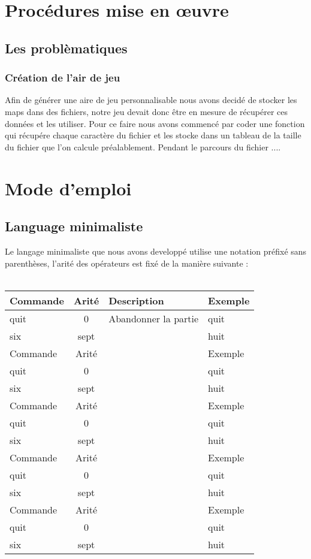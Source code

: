 \documentclass[a4paper, 11pt]{article}
\title{\myfont {Robots programmables}}
\author{\huge {COTREZ Léo}\and \huge {ORNIACKI Thomas}\and \\Université Paris-VIII, Saint-Denis, France\and \\Licence 2 Informatique}
\date{Premier Semestre 2018}
\begin{document}
\maketitle

\newpage
\tableofcontents

\newpage
\section{Procédures mise en \oe uvre}
\subsection{Les problèmatiques}
\subsubsection{Création de l'air de jeu}
Afin de générer une aire de jeu personnalisable nous avons decidé de stocker les maps dans des fichiers, notre jeu devait donc être en mesure de récupérer ces données et les utiliser. Pour ce faire nous avons commencé par coder une fonction qui récupére chaque caractère du fichier et les stocke dans un tableau de la taille du fichier que l'on calcule préalablement. Pendant le parcours du fichier ....

\newpage
\section{Mode d'emploi}
\subsection{Language minimaliste}
Le langage minimaliste que nous avons developpé utilise une notation préfixé sans parenthèses, l'arité des opérateurs est fixé de la manière suivante :\\\\
\begin{tabular}{|l|c|l|l|}
   \hline
   Commande & Arité & Description & Exemple \\
	 \hline
   quit & 0 & Abandonner la partie & quit \\
   \hline
   six & sept & & huit \\
   \hline
	 Commande & Arité & & Exemple \\
	 \hline
   quit & 0 & & quit \\
   \hline
   six & sept & & huit \\
   \hline
	 Commande & Arité & & Exemple \\
	 \hline
   quit & 0 & & quit \\
   \hline
   six & sept & & huit \\
   \hline
	 Commande & Arité & & Exemple \\
	 \hline
   quit & 0 & & quit \\
   \hline
   six & sept & & huit \\
   \hline
	 Commande & Arité & & Exemple \\
	 \hline
   quit & 0 & & quit \\
   \hline
   six & sept & & huit \\
   \hline
\end{tabular}
\end{document}
